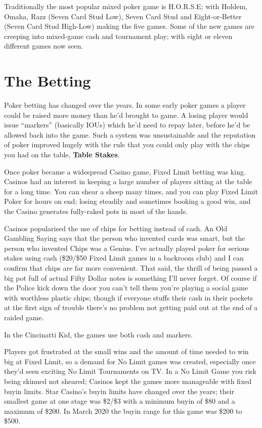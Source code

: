 Traditionally the most popular mixed poker game is H.O.R.S.E; with
Holdem, Omaha, Razz (Seven Card Stud Low), Seven Card Stud and
Eight-or-Better (Seven Card Stud High-Low) making the five games.
Some of the new games are creeping into mixed-game cash and tournament
play; with eight or eleven different games now seen.

\section{The Betting}

Poker betting has changed over the years. In some early poker games
a player could be raised more money than he'd brought to
game. A losing player would issue ``markers'' (basically IOUs) which
he'd need to repay later, before he'd be allowed back into the
game. Such a system was unsustainable and the reputation of poker
improved hugely with the rule that you could only play with the
chips you had on the table, \textbf{Table Stakes}.

Once poker became a widespread Casino game, Fixed Limit betting was
king. Casinos had an interest in keeping a large number of players
sitting at the table for a long time. You can shear a sheep many times,
and you can play Fixed Limit Poker for hours on end; losing steadily
and sometimes booking a good win, and the Casino generates fully-raked
pots in most of the hands.

Casinos popularised the use of chips for betting instead of cash.
An Old Gambling Saying says that the person who invented cards was
smart, but the person who invented Chips was a Genius. I've actually
played poker for serious stakes using cash (\$20/\$50 Fixed Limit
games in a backroom club) and I can confirm that chips are far more
convenient. That said, the thrill of being passed a big pot full of
actual Fifty Dollar notes is something I'll never forget. Of course if
the Police kick down the door you can't tell them you're playing
a social game with worthless plastic chips; though if everyone stuffs
their cash in their pockets at the first sign of trouble there's no
problem not getting paid out at the end of a raided game.

In the Cincinatti Kid, the games use both cash and markers.


Players got frustrated at the small wins and the amount of time needed
to win big at Fixed Limit, so a demand for No Limit games was created,
especially once they'd seen exciting No Limit Tournaments on TV.
In a No Limit Game you risk being skinned not sheared; Casinos kept
the games more manageable with fixed buyin limits. Star Casino's buyin limits
have changed over the years; their smallest game at one stage was
\$2/\$3 with a minimum buyin of \$80 and a maximum of \$200. In March 2020
the buyin range for this game was \$200 to \$500.

